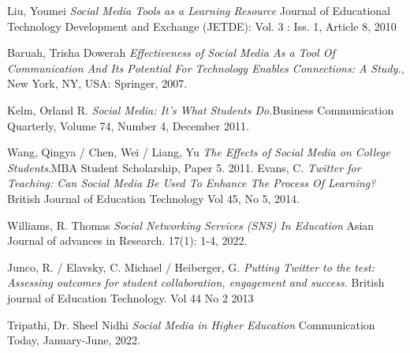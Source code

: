 \documentclass[lettersize,journal]{IEEEtran}
\begin{document}
\begin{thebibliography}{}


        Liu, Youmei {\it{Social Media Tools as a Learning Resource}} Journal of Educational Technology Development and Exchange (JETDE): Vol. 3 : Iss. 1, Article 8, 2010


    Baruah, Trisha Dowerah {\it{Effectiveness of Social Media As a Tool Of Communication And Its Potential For Technology Enables Connections: A Study.}}, New York, NY, USA: Springer, 2007.


    Kelm, Orland R. {\it{Social Media: It's What Students Do.}}Business Communication Quarterly, Volume 74, Number 4, December 2011.

        Wang, Qingya / Chen, Wei / Liang, Yu {\it{The Effects of Social Media on College Students}}.MBA Student Scholarship, Paper 5. 2011.
        Evans, C. {\it{Twitter for Teaching: Can Social Media Be Used To Enhance The Process Of Learning?}} British Journal of Education Technology
Vol 45, No 5, 2014.

        Williams, R. Thomas {\it{Social Networking Services (SNS) In Education}}
        Asian Journal of advances in Research. 17(1): 1-4, 2022.

        Junco, R. / Elavsky, C. Michael / Heiberger, G. {\it{Putting Twitter to
        the test: Assessing outcomes for student collaboration, engagement and
        success.}} British journal of Education Technology. Vol 44 No 2 2013

        Tripathi, Dr. Sheel Nidhi {\it{Social Media in Higher Education}}
        Communication Today, January-June, 2022.


\end{thebibliography}
\end{document}
